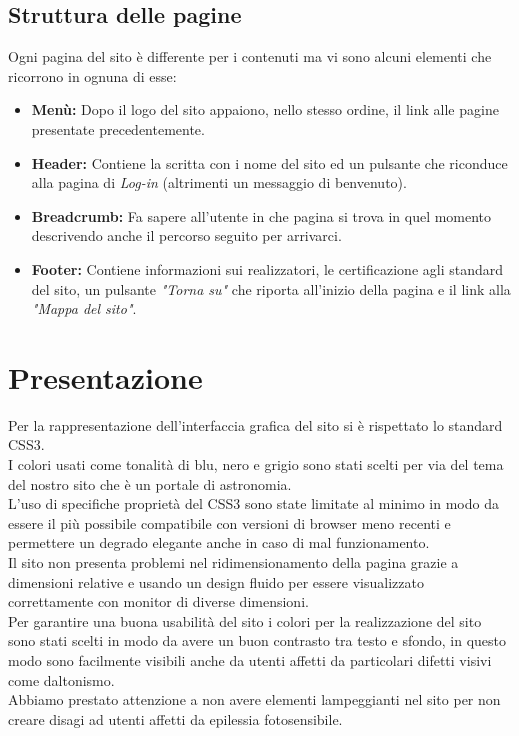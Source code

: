 	\subsection{Struttura delle pagine}
	Ogni pagina del sito è differente per i contenuti ma vi sono alcuni elementi che ricorrono in ognuna di esse:
	\begin{itemize}
	\item \textbf{Menù:}  Dopo il logo del sito appaiono, nello stesso ordine, il link alle pagine presentate precedentemente.
	\item \textbf{Header:} Contiene la scritta con i nome del sito ed un pulsante che riconduce alla pagina di \textit{Log-in} (altrimenti un messaggio di benvenuto).
	\item \textbf{Breadcrumb:} Fa sapere all'utente in che pagina si trova in quel momento descrivendo anche il percorso seguito per arrivarci. 
	\item \textbf{Footer:} Contiene informazioni sui realizzatori, le certificazione agli standard del sito, un pulsante \textit{"Torna su"} che riporta all'inizio della pagina e il link alla \textit{"Mappa del sito"}.
	\end{itemize}
	 
\section{Presentazione}
	Per la rappresentazione dell'interfaccia grafica del sito si è rispettato lo standard CSS3. \\
	I colori usati come tonalità di blu, nero e grigio sono stati scelti per via del tema del nostro sito che è un portale di astronomia. \\
	L'uso di specifiche proprietà del CSS3 sono state limitate al minimo in modo da essere il più possibile compatibile con versioni di browser meno recenti e permettere un degrado elegante anche in caso di mal funzionamento. \\
	Il sito non presenta problemi nel ridimensionamento della pagina grazie a dimensioni relative e usando un design fluido per essere visualizzato correttamente con monitor di diverse dimensioni. \\
	Per garantire una buona usabilità del sito i colori per la realizzazione del sito sono stati scelti in modo da avere un buon contrasto tra testo e sfondo, in questo modo sono facilmente visibili anche da utenti affetti da particolari difetti visivi come daltonismo. \\
	Abbiamo prestato attenzione a non avere elementi lampeggianti nel sito per non creare disagi ad utenti affetti da epilessia fotosensibile. \\
